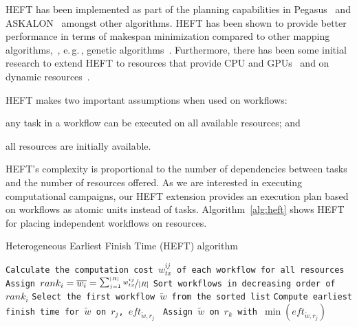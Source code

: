 HEFT has been implemented as part of the planning capabilities in 
Pegasus~\cite{deelman2015pegasus} and ASKALON~\cite{fahringer2005askalon} 
amongst other algorithms. HEFT has been shown to provide better performance in 
terms of makespan minimization compared to other mapping 
algorithms,~\cite{topcuoglu2002performance,canon2008comparative}, e.\,g.\,, 
genetic algorithms~\cite{fahringer2005askalon}. Furthermore, there has been 
some initial research to extend HEFT to resources that provide CPU and 
GPUs~\cite{shetti2013optimization} and on dynamic 
resources~\cite{dong2007pfas}. 

HEFT makes two important assumptions when used on workflows: 
\begin{inparaenum}[(1)] 
    \item any task in a workflow can be executed on all available resources; and 
    \item all resources are initially available.
\end{inparaenum}
HEFT's complexity is proportional to the number of dependencies between tasks 
and the number of resources offered. As we are interested in executing 
computational campaigns, our HEFT extension provides an execution plan based 
on workflows as atomic units instead of tasks. Algorithm~\ref{alg:heft} shows 
HEFT for placing independent workflows on resources.

\begin{algorithm}[t]
    \caption{Heterogeneous Earliest Finish Time (HEFT) algorithm}
    \label{alg:heft}
    \scriptsize
    \begin{algorithmic}[1]
        \State \texttt{Calculate the computation cost $w_{tx}^{ij}$ of each workflow for all resources}
        \State \texttt{Assign $rank_i = \overline{w_{i}} = \nicefrac{\sum_{j=1}^{|R|}w_{tx}^{ij}}{|R|}$}
        \State \texttt{Sort workflows in decreasing order of $rank_i$}
        \State \texttt{Select the first workflow $\tilde{w}$ from the sorted list}
        \State\texttt{Compute earliest finish time for $\tilde{w}$ on $r_{j}$, $eft_{\tilde{w},r_j}$ }
        \EndFor
        \State \texttt{Assign  $\tilde{w}$ on $r_k$ with $\min{(eft_{\tilde{w},r_j})}$}
        \EndWhile
        \EndProcedure
    \end{algorithmic}
\end{algorithm}

